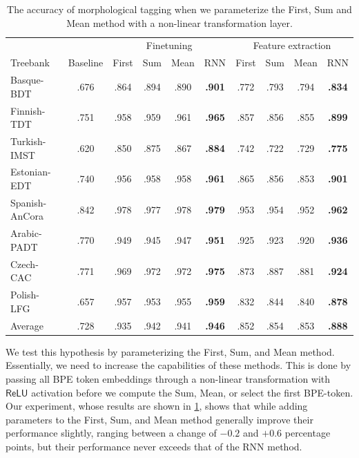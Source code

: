 \documentclass[11pt]{article}
\begin{document}
    \begin{table}%
	\centering
	\begin{tabular}{l|c|cccc|cccc}
		& & \multicolumn{4}{c}{Finetuning} & \multicolumn{4}{c}{Feature extraction} \\
		Treebank & Baseline & First & Sum & Mean & RNN & First & Sum & Mean & RNN \\
		\hline
		Basque-BDT      & .676 & .864 & .894 & .890 & \textbf{.901} & .772 & .793 & .794 & \textbf{.834} \\
		Finnish-TDT     & .751 & .958 & .959 & .961 & \textbf{.965} & .857 & .856 & .855 & \textbf{.899} \\
		Turkish-IMST    & .620 & .850 & .875 & .867 & \textbf{.884} & .742 & .722 & .729 & \textbf{.775} \\
		Estonian-EDT    & .740 & .956 & .958 & .958 & \textbf{.961} & .865 & .856 & .853 & \textbf{.901} \\
		Spanish-AnCora  & .842 & .978 & .977 & .978 & \textbf{.979} & .953 & .954 & .952 & \textbf{.962} \\
		Arabic-PADT     & .770 & .949 & .945 & .947 & \textbf{.951} & .925 & .923 & .920 & \textbf{.936} \\
		Czech-CAC       & .771 & .969 & .972 & .972 & \textbf{.975} & .873 & .887 & .881 & \textbf{.924} \\
		Polish-LFG      & .657 & .957 & .953 & .955 & \textbf{.959} & .832 & .844 & .840 & \textbf{.878} \\
        \hline
        Average         & .728 & .935 & .942 & .941 & \textbf{.946} & .852 & .854 & .853 & \textbf{.888} \\
	\end{tabular}
        	\caption{\label{tab:commutative-parameters} The accuracy
     of morphological tagging when we parameterize the First, Sum and Mean method
     with a non-linear transformation layer.}
    \end{table}

             We test this hypothesis by parameterizing the First, Sum,
     and Mean method. Essentially, we need to increase the
     capabilities of these methods.
            This is done by passing all BPE token embeddings through a
     non-linear transformation with $\mathsf{ReLU}$ activation before
     we compute the Sum, Mean, or select the first BPE-token.
                    Our experiment, whose results are shown in
     \cref{tab:commutative-parameters}, shows that while adding
     parameters to the First, Sum, and Mean method generally improve their
     performance slightly, ranging between a change of  $-0.2$ and
     $+0.6$ percentage points, but their performance never exceeds that
     of the RNN method.
\end{document}
